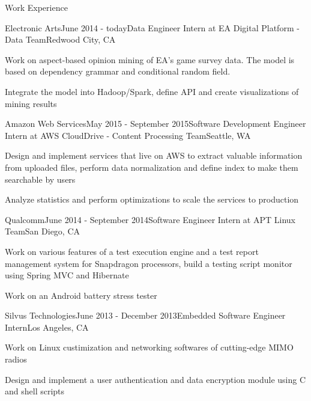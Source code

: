 \documentclass{resume} %
\begin{document}
\begin{rSection}{Work Experience}

\begin{rSubsection}{Electronic Arts}{June 2014 - today}{Data Engineer Intern at EA Digital Platform - Data Team}{Redwood City, CA}
\item Work on aspect-based opinion mining of EA's game survey data. The model is based on dependency grammar and conditional random field.
\item Integrate the model into Hadoop/Spark, define API and create visualizations of mining results
\end{rSubsection}



\begin{rSubsection}{Amazon Web Services}{May 2015 - September 2015}{Software Development Engineer Intern at AWS CloudDrive - Content Processing Team}{Seattle, WA}
\item Design and implement services that live on AWS to extract valuable information from uploaded files, perform data normalization and define index to make them searchable by users
\item Analyze statistics and perform optimizations to scale the services to production
\end{rSubsection}


\begin{rSubsection}{Qualcomm}{June 2014 - September 2014}{Software Engineer Intern at APT Linux Team}{San Diego, CA}
\item Work on various features of a test execution engine and a test report management system for Snapdragon processors, build a testing script monitor using Spring MVC and Hibernate
\item Work on an Android battery stress tester
\end{rSubsection}


\begin{rSubsection}{Silvus Technologies}{June 2013 - December 2013}{Embedded Software Engineer Intern}{Los Angeles, CA}
\item Work on Linux custimization and networking softwares of cutting-edge MIMO radios
\item Design and implement a user authentication and data encryption module using C and shell scripts
\end{rSubsection}

\end{rSection}
\end{document}
